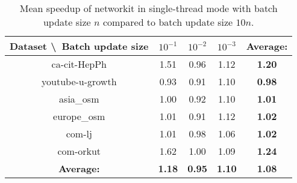 \begin{table}[H]
	\centering
	\begin{tabular}{|c|c|c|c|c|}
		\hline
		Dataset \textbackslash\ Batch update size& $10^{-1}$ & $10^{-2}$ & $10^{-3}$ & \textbf{Average:} \\
		\hline
		ca-cit-HepPh & 1.51 & 0.96 & 1.12 & \textbf{1.20} \\
		\hline
		youtube-u-growth & 0.93 & 0.91 & 1.10 & \textbf{0.98} \\
		\hline
		asia\_osm & 1.00 & 0.92 & 1.10 & \textbf{1.01} \\
		\hline
		europe\_osm & 1.01 & 0.91 & 1.12 & \textbf{1.02} \\
		\hline
		com-lj & 1.01 & 0.98 & 1.06 & \textbf{1.02} \\
		\hline
		com-orkut & 1.62 & 1.00 & 1.09 & \textbf{1.24} \\
		\hline
		\textbf{Average:} & \textbf{1.18} & \textbf{0.95} & \textbf{1.10} & \textbf{1.08} \\
		\hline
	\end{tabular}
\caption{Mean speedup of networkit in single-thread mode with batch update size $n$ compared to batch update size $10 n$.}
\label{T:time speedup for networkit}
\end{table}